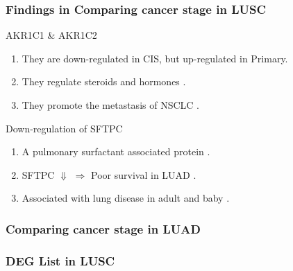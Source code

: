 \documentclass{beamer}
\begin{document}
    \begin{frame}
        \frametitle{Findings in Comparing cancer stage in LUSC}

        \begin{block}{AKR1C1 \& AKR1C2}
            \begin{enumerate}
                \item They are down-regulated in CIS, but up-regulated in Primary.
                \item They regulate steroids \cite{AKR1C1-1} and hormones \cite{AKR1C1-2} .
                \item They promote the metastasis of NSCLC \cite{AKR1C1-3}.
            \end{enumerate}
        \end{block}

        \begin{block}{Down-regulation of SFTPC}
            \begin{enumerate}
                \item A pulmonary surfactant associated protein \cite{SFTPC4}.
                \item SFTPC $\Downarrow$ $\Rightarrow$ Poor survival in LUAD \cite{SFTPC1}.
                \item Associated with lung disease in adult \cite{SFTPC2} and baby \cite{SFTPC3}.
            \end{enumerate}
        \end{block}
    \end{frame}

    \subsubsection{Comparing cancer stage in LUAD}
    \begin{frame}
        \frametitle{DEG List in LUSC}

        \begin{table}
            \caption{Up-regulated DEG in LUAD}
            
        \end{table}

        \begin{table}
            \caption{Down-regulated DEG in LUAD}
            
        \end{table}
    \end{frame}
\end{document}
